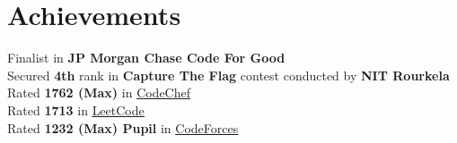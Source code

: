 \section{Achievements}
\begin{itemize}[leftmargin=0.15in, label={}]
  \small{\item{
        Finalist in \textbf{JP Morgan Chase Code For Good} \\
        Secured \textbf{4th} rank in \textbf{Capture The Flag} contest conducted by \textbf{NIT Rourkela} \\
        Rated \textbf{1762 (Max)} in \href{https://www.codechef.com/users/ashu2909}{\underline{CodeChef}} \\
        Rated \textbf{1713} in \href{https://leetcode.com/ashu_coder/}{\underline{LeetCode}} \\
        Rated \textbf{1232 (Max) Pupil} in \href{https://codeforces.com/profile/ashucoder}{\underline{CodeForces}} \\
  }}
\end{itemize}